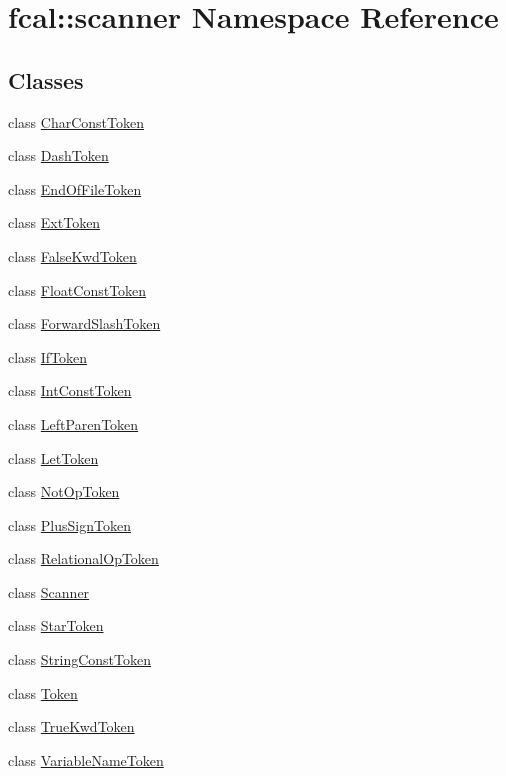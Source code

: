 \hypertarget{namespacefcal_1_1scanner}{}\section{fcal\+:\+:scanner Namespace Reference}
\label{namespacefcal_1_1scanner}
\subsection*{Classes}
\begin{DoxyCompactItemize}
\item 
class \hyperlink{classfcal_1_1scanner_1_1CharConstToken}{Char\+Const\+Token}
\item 
class \hyperlink{classfcal_1_1scanner_1_1DashToken}{Dash\+Token}
\item 
class \hyperlink{classfcal_1_1scanner_1_1EndOfFileToken}{End\+Of\+File\+Token}
\item 
class \hyperlink{classfcal_1_1scanner_1_1ExtToken}{Ext\+Token}
\item 
class \hyperlink{classfcal_1_1scanner_1_1FalseKwdToken}{False\+Kwd\+Token}
\item 
class \hyperlink{classfcal_1_1scanner_1_1FloatConstToken}{Float\+Const\+Token}
\item 
class \hyperlink{classfcal_1_1scanner_1_1ForwardSlashToken}{Forward\+Slash\+Token}
\item 
class \hyperlink{classfcal_1_1scanner_1_1IfToken}{If\+Token}
\item 
class \hyperlink{classfcal_1_1scanner_1_1IntConstToken}{Int\+Const\+Token}
\item 
class \hyperlink{classfcal_1_1scanner_1_1LeftParenToken}{Left\+Paren\+Token}
\item 
class \hyperlink{classfcal_1_1scanner_1_1LetToken}{Let\+Token}
\item 
class \hyperlink{classfcal_1_1scanner_1_1NotOpToken}{Not\+Op\+Token}
\item 
class \hyperlink{classfcal_1_1scanner_1_1PlusSignToken}{Plus\+Sign\+Token}
\item 
class \hyperlink{classfcal_1_1scanner_1_1RelationalOpToken}{Relational\+Op\+Token}
\item 
class \hyperlink{classfcal_1_1scanner_1_1Scanner}{Scanner}
\item 
class \hyperlink{classfcal_1_1scanner_1_1StarToken}{Star\+Token}
\item 
class \hyperlink{classfcal_1_1scanner_1_1StringConstToken}{String\+Const\+Token}
\item 
class \hyperlink{classfcal_1_1scanner_1_1Token}{Token}
\item 
class \hyperlink{classfcal_1_1scanner_1_1TrueKwdToken}{True\+Kwd\+Token}
\item 
class \hyperlink{classfcal_1_1scanner_1_1VariableNameToken}{Variable\+Name\+Token}
\end{DoxyCompactItemize}
